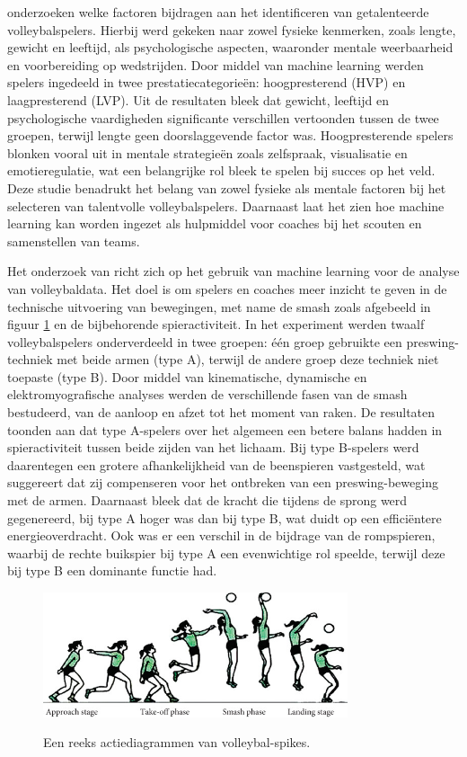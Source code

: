 \textcite{Musa2021} onderzoeken welke factoren bijdragen aan het identificeren van getalenteerde volleybalspelers. Hierbij werd gekeken naar zowel fysieke kenmerken, zoals lengte, gewicht en leeftijd, als psychologische aspecten, waaronder mentale weerbaarheid en voorbereiding op wedstrijden. Door middel van machine learning werden spelers ingedeeld in twee prestatiecategorieën: hoogpresterend (HVP) en laagpresterend (LVP).
Uit de resultaten bleek dat gewicht, leeftijd en psychologische vaardigheden significante verschillen vertoonden tussen de twee groepen, terwijl lengte geen doorslaggevende factor was. Hoogpresterende spelers blonken vooral uit in mentale strategieën zoals zelfspraak, visualisatie en emotieregulatie, wat een belangrijke rol bleek te spelen bij succes op het veld.
Deze studie benadrukt het belang van zowel fysieke als mentale factoren bij het selecteren van talentvolle volleybalspelers. Daarnaast laat het zien hoe machine learning kan worden ingezet als hulpmiddel voor coaches bij het scouten en samenstellen van teams.

Het onderzoek van \textcite{Dai2021} richt zich op het gebruik van machine learning voor de analyse van volleybaldata. Het doel is om spelers en coaches meer inzicht te geven in de technische uitvoering van bewegingen, met name de smash zoals afgebeeld in figuur \ref{fig:spike} en de bijbehorende spieractiviteit. In het experiment werden twaalf volleybalspelers onderverdeeld in twee groepen: één groep gebruikte een preswing-techniek met beide armen (type A), terwijl de andere groep deze techniek niet toepaste (type B).
Door middel van kinematische, dynamische en elektromyografische analyses werden de verschillende fasen van de smash bestudeerd, van de aanloop en afzet tot het moment van raken. De resultaten toonden aan dat type A-spelers over het algemeen een betere balans hadden in spieractiviteit tussen beide zijden van het lichaam. Bij type B-spelers werd daarentegen een grotere afhankelijkheid van de beenspieren vastgesteld, wat suggereert dat zij compenseren voor het ontbreken van een preswing-beweging met de armen.
Daarnaast bleek dat de kracht die tijdens de sprong werd gegenereerd, bij type A hoger was dan bij type B, wat duidt op een efficiëntere energieoverdracht. Ook was er een verschil in de bijdrage van de rompspieren, waarbij de rechte buikspier bij type A een evenwichtige rol speelde, terwijl deze bij type B een dominante functie had.

\begin{figure}
  \centering
  \includegraphics[width=0.8\textwidth]{img/spike.jpg}
  \caption{\label{fig:spike}Een reeks actiediagrammen van volleybal-spikes.}
  \autocite{Dai2021}
\end{figure}

